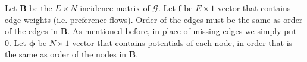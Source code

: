\documentclass[letterpaper, 10pt, conference]{ieeeconf}
\newcommand{\matr}[1]{\mathbold{#1}}
\newcommand{\graph}[1]{\mathcal{#1}}
\begin{document}
    Let $\matr{B}$ be the $E \times N$ incidence matrix of $\graph{G}$.
%
    Let $\matr{f}$ be $E \times 1$ vector that contains edge weights (i.e. preference flows).
    Order of the edges must be the same as order of the edges in $\matr{B}$.
    As mentioned before, in place of missing edges we simply put 0.
%    
    Let $\matr{\phi}$ be $N \times 1$ vector that contains potentials of each node, in order that is the same as order of the nodes in $\matr{B}$.
    
\end{document}
